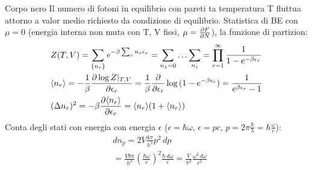 \begin{frame}{Corpo nero}
    Il numero di fotoni in equilibrio con pareti ta temperatura T fluttua attorno a valor medio richiesto da condizione di equilibrio. Statistica di BE con $\mu=0$ (energia interna non muta con T, V fissi, $\mu=\PDy{N}{F}$), la funzione di partizion:
\begin{align*}
    &Z(T,V)=\sum_{\{n_r\}}\exp{-\beta\sum_rn_r\epsilon_r}=\sum_{n_1=0}\ldots\sum_{n_j}=\prod_{r=1}^{\infty}\frac{1}{1-\exp{-\beta\epsilon_r}}\\
    &\exv{n_r}=-\frac{1}{\beta}\PDy{\epsilon_r}{\log{Z}|_{T,V}}=\frac{1}{\beta}\PDof{\epsilon_r}\log{(1-\exp{-\beta\epsilon_r})}=\frac{1}{\exp{\beta\epsilon_r}-1}\\
    &(\Delta n_r)^2=-\beta\PDy{\epsilon_r}{\exv{n_r}}=\exv{n_r}(1+\exv{n_r})
\end{align*}
Conta degli stati con energia con energia $\epsilon$ ($\epsilon=\hbar\omega$, $\epsilon=pc$, $p=2\pi\frac{\hbar}{\lambda}=\hbar\frac{\omega}{c}$):
\begin{align*}
    &dn_p=2 V\frac{4\pi}{h^3}p^2\,dp\tag{2 polarization}\\
    &=\frac{V8\pi}{h^3}(\frac{\hbar\omega}{c})^2\frac{\hbar\,d\omega}{c}=\frac{V}{\pi^2}\frac{\omega^2\,d\omega}{c^3}\\
    &
\end{align*}
\end{frame}
